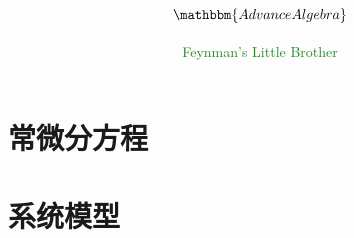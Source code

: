 \documentclass[UTF8]{ctexart}
\title{\fontsize{40pt}{80pt} $\mathbbm{Advance Algebra}$}
\author{\textcolor{ForestGreen}{Feynman's Little Brother}}
\begin{document}

\section{常微分方程}
    
    \newpage

\section{系统模型}
    
    \newpage
\end{document}
